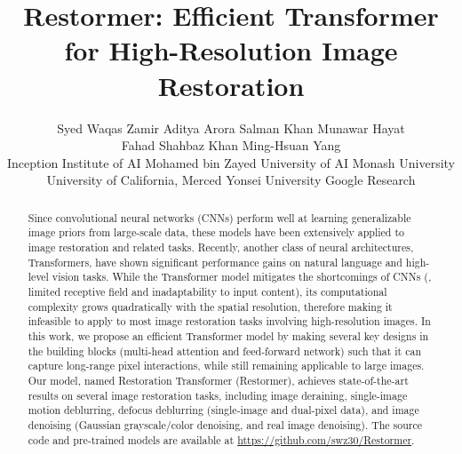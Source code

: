 \documentclass[10pt,twocolumn,letterpaper]{article}
\def\xnet{Restormer\xspace}
\begin{document}
\title{\vspace{-0.5em}\xnet: Efficient Transformer for High-Resolution Image Restoration\vspace{-0.5em}}


\author{
Syed Waqas Zamir \quad Aditya Arora  \quad Salman Khan \quad Munawar Hayat \\ 
Fahad Shahbaz Khan  \quad Ming-Hsuan Yang \\
Inception Institute of AI \quad Mohamed bin Zayed University of AI \quad
Monash University\\
University of California, Merced \quad Yonsei University \quad Google Research 
\vspace{-0.5em}
}

\maketitle

\begin{abstract}\vspace{-0.5em}
Since convolutional neural networks (CNNs) perform well at learning generalizable image priors from large-scale data, these models have been extensively applied to image restoration and related tasks. Recently, another class of neural architectures, Transformers, have shown significant performance gains on natural language and high-level vision tasks. While the Transformer model mitigates the shortcomings of CNNs (\ie, limited receptive field and inadaptability to input content), its computational complexity grows quadratically with the spatial resolution, therefore making it infeasible to apply to most image restoration tasks involving high-resolution images. In this work, we propose an efficient Transformer model by making several key designs in the building blocks (multi-head attention and feed-forward network) such that it can capture long-range pixel interactions, while still remaining applicable to large images. Our model, named Restoration Transformer ({\xnet}), achieves state-of-the-art results on several image restoration tasks, including image deraining,  single-image motion deblurring, defocus deblurring (single-image and dual-pixel data), and image denoising (Gaussian grayscale/color denoising, and real image denoising). The source code and pre-trained models are available at \url{https://github.com/swz30/Restormer}. 
    

\end{abstract}
\end{document}

